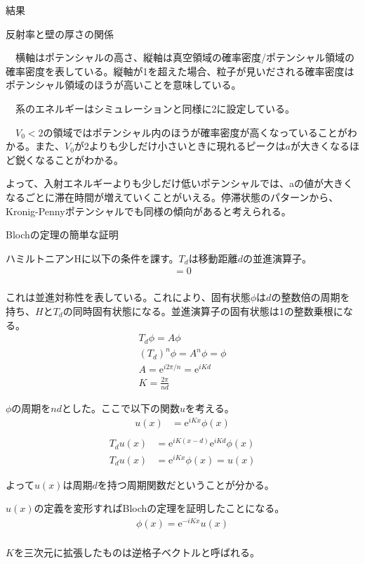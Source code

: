 \documentclass[a4paper, lualatex]{bxjsarticle}
\begin{document}
\begin{section}{結果}
\begin{subsection}{反射率と壁の厚さの関係}
\begin{figure}[h]
    \end{figure}
    \par　横軸はポテンシャルの高さ、縦軸は真空領域の確率密度/ポテンシャル領域の確率密度を表している。縦軸が1を超えた場合、粒子が見いだされる確率密度はポテンシャル領域のほうが高いことを意味している。
    \par　系のエネルギーはシミュレーションと同様に2に設定している。
    \par　$V_0<2$の領域ではポテンシャル内のほうが確率密度が高くなっていることがわかる。また、$V_0$が2よりも少しだけ小さいときに現れるピークは$a$が大きくなるほど鋭くなることがわかる。
    \par よって、入射エネルギーよりも少しだけ低いポテンシャルでは、aの値が大きくなるごとに滞在時間が増えていくことがいえる。停滞状態のパターンから、Kronig-Pennyポテンシャルでも同様の傾向があると考えられる。
    \end{subsection}
\end{section}
\newpage
\appendix
\begin{section}{Blochの定理の簡単な証明}
    \par ハミルトニアンHに以下の条件を課す。$T_d$は移動距離$d$の並進演算子。
    \begin{align}
     [T_d,H]=0\nonumber\\
    \end{align}
    \par これは並進対称性を表している。これにより、固有状態$\phi$は$d$の整数倍の周期を持ち、$H$と$T_d$の同時固有状態になる。並進演算子の固有状態は1の整数乗根になる。
    \begin{align}
     T_d\phi=A\phi\nonumber\\
        (T_d)^n\phi=A^n\phi=\phi\nonumber\\
        A=\mathrm{e}^{i2\pi/n}=\mathrm{e}^{iKd}\nonumber\\
        K=\frac{2\pi}{n d}
    \end{align}
    \par $\phi$の周期を$nd$とした。ここで以下の関数$u$を考える。
    \begin{align}
     u(x) &= \mathrm{e}^{iKx}\phi(x)\label{ux}\nonumber\\
    \end{align}
    \begin{align}
     T_d u(x) &= \mathrm{e}^{iK(x-d)}\mathrm{e}^{iKd}\phi(x)\nonumber\\
        T_d u(x) &= \mathrm{e}^{iKx}\phi(x)=u(x)
    \end{align}
    \par よって$u(x)$は周期$d$を持つ周期関数だということが分かる。
    \par $u(x)$の定義を変形すればBlochの定理を証明したことになる。
    \begin{align}
     \phi(x) = \mathrm{e}^{-iKx}u(x)\nonumber\\
    \end{align}
    \par $K$を三次元に拡張したものは逆格子ベクトルと呼ばれる。
\end{section}
\end{document}
